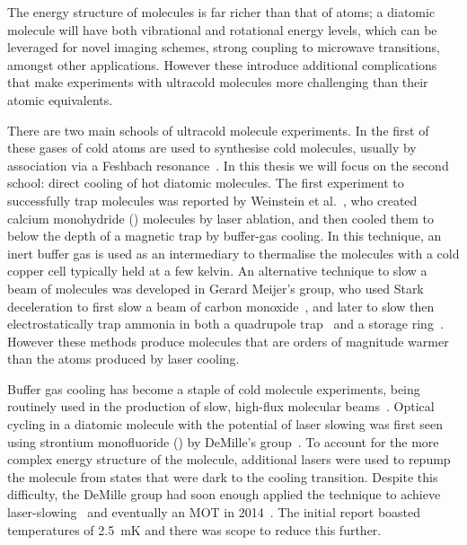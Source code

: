 The energy structure of molecules is far richer than that of atoms; a diatomic
molecule will have both vibrational and rotational energy levels, which can be
leveraged for novel imaging schemes, strong coupling to microwave transitions,
amongst other applications. However these introduce additional complications
that make experiments with ultracold molecules more challenging than their
atomic equivalents.

There are two main schools of ultracold molecule experiments. In the first of
these gases of cold atoms are used to synthesise cold molecules, usually by
association via a Feshbach resonance~\cite{PhysRevA.89.033604}.  In this thesis
we will focus on the second school: direct cooling of hot diatomic molecules.
The first experiment to successfully trap molecules was reported by Weinstein
et al.~\cite{Weinstein1998}, who created calcium monohydride (\CaH{}) molecules
by laser ablation, and then cooled them to below the depth of a magnetic trap
by buffer-gas cooling. In this technique, an inert buffer gas is used as an
intermediary to thermalise the molecules with a cold copper cell typically held
at a few kelvin.
%
An alternative technique to slow a beam of molecules was developed in Gerard
Meijer's group, who used Stark deceleration to first slow a beam of carbon
monoxide~\cite{Bethlem1999}, and later to slow then electrostatically trap
ammonia in both a quadrupole trap~\cite{Bethlem2000} and a storage
ring~\cite{Crompvoets2001, Crompvoets2005}. However these methods produce
molecules that are orders of magnitude warmer than the atoms produced by laser
cooling.


Buffer gas cooling has become a staple of cold molecule experiments, being
routinely used in the production of slow, high-flux molecular
beams~\cite{Maxwell2005, Patterson2007, Barry2011}.  Optical cycling in a
diatomic molecule with the potential of laser slowing was first seen using
strontium monofluoride (\SrF{}) by DeMille's group~\cite{Shuman2009}. To
account for the more complex energy structure of the molecule, additional
lasers were used to repump the molecule from states that were dark to the
cooling transition.  Despite this difficulty, the DeMille group had soon enough
applied the technique to achieve laser-slowing~\cite{PhysRevLett.108.103002}
and eventually an \SrF{} MOT in 2014~\cite{Barry2014, PhysRevLett.116.063004}.
The initial report boasted temperatures of \SI{2.5}{\milli\kelvin} and
there was scope to reduce this further.


